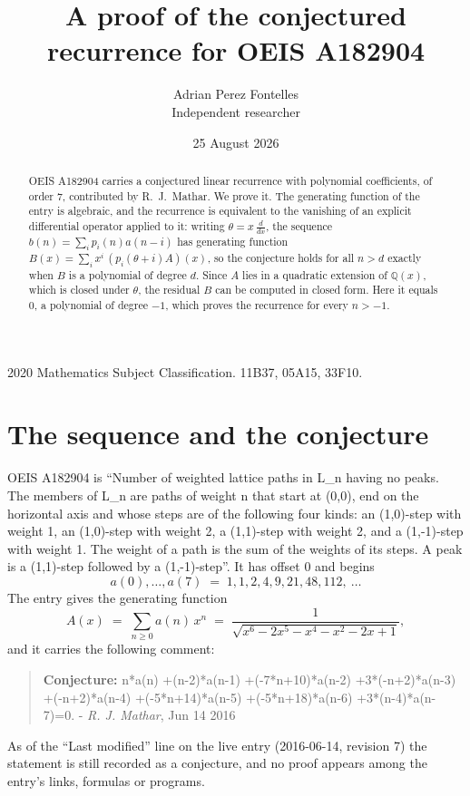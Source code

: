 \documentclass[11pt,a4paper]{article}
\title{A proof of the conjectured recurrence for OEIS A182904}
\author{Adrian Perez Fontelles\\ \small Independent researcher}
\date{25 August 2026}
\theoremstyle{plain}
\theoremstyle{definition}
\begin{document}
\maketitle

\begin{abstract}
OEIS A182904 carries a conjectured linear recurrence with polynomial coefficients, of
order 7, contributed by R.~J.~Mathar. We prove it. The generating function of the
entry is algebraic, and the recurrence is equivalent to the vanishing of an explicit
differential operator applied to it: writing $\theta=x\,\frac{d}{dx}$, the sequence
$b(n)=\sum_{i}p_{i}(n)a(n-i)$ has generating function
$B(x)=\sum_{i}x^{i}\,(p_{i}(\theta+i)A)(x)$, so the conjecture holds for all $n>d$ exactly
when $B$ is a polynomial of degree $d$. Since $A$ lies in a quadratic extension of
$\mathbb{Q}(x)$, which is closed under $\theta$, the residual $B$ can be computed in
closed form. Here it equals $0$, a polynomial of degree $-1$, which proves
the recurrence for every $n>-1$.
\end{abstract}

\noindent\small 2020 Mathematics Subject Classification. 11B37, 05A15, 33F10.\normalsize

\section{The sequence and the conjecture}

OEIS A182904 is ``Number of weighted lattice paths in L\_n having no peaks. The members of L\_n are paths of weight n that start at (0,0), end on the horizontal axis and whose steps are of the following four kinds: an (1,0)-step with weight 1, an (1,0)-step with weight 2, a (1,1)-step with weight 2, and a (1,-1)-step with weight 1. The weight of a path is the sum of the weights of its steps. A peak is a (1,1)-step followed by a (1,-1)-step''. It has offset $0$ and begins
\[
a(0),\dots,a(7)\;=\;1, 1, 2, 4, 9, 21, 48, 112,\ \dots
\]
The entry gives the generating function
\begin{equation}\label{eq:gf}
A(x)\;=\;\sum_{n\ge 0} a(n)\,x^{n}\;=\;\frac{1}{\sqrt{x^{6} - 2 x^{5} - x^{4} - x^{2} - 2 x + 1}} ,
\end{equation}
and it carries the following comment:
\begin{quote}\small
\textbf{Conjecture:} n*a(n) +(n-2)*a(n-1) +(-7*n+10)*a(n-2) +3*(-n+2)*a(n-3) +(-n+2)*a(n-4) +(-5*n+14)*a(n-5) +(-5*n+18)*a(n-6) +3*(n-4)*a(n-7)=0. - \emph{R. J. Mathar}, Jun 14 2016
\end{quote}
As of the ``Last modified'' line on the live entry (2016-06-14, revision 7) the
statement is still recorded as a conjecture, and no proof appears among the entry's links,
formulas or programs.
\end{document}
